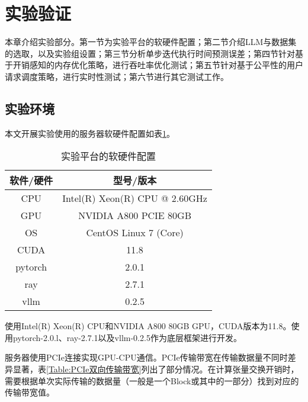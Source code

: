 \section{实验验证}

本章介绍实验部分。第一节为实验平台的软硬件配置；第二节介绍LLM与数据集的选取，以及实验组设置；第三节分析单步迭代执行时间预测误差；第四节针对基于开销感知的内存优化策略，进行吞吐率优化测试；第五节针对基于公平性的用户请求调度策略，进行实时性测试；第六节进行其它测试工作。

\subsection{实验环境}

本文开展实验使用的服务器软硬件配置如表\ref{Table:实验平台的软硬件配置}。

\begin{table}[H]
  \centering
  \caption{实验平台的软硬件配置}
  \label{Table:实验平台的软硬件配置}
  \renewcommand{\arraystretch}{1.2}
  \small
  \begin{tabular}{c c}
    \toprule
    \textbf{软件/硬件} & \textbf{型号/版本} \\ 
    \midrule
    CPU & Intel(R) Xeon(R) CPU @ 2.60GHz  \\ 
    GPU & NVIDIA A800 PCIE 80GB \\ 
    OS & CentOS Linux 7 (Core) \\ 
    CUDA & 11.8 \\ 
    pytorch & 2.0.1 \\ 
    ray & 2.7.1 \\
    vllm & 0.2.5 \\ 
    \bottomrule
  \end{tabular}
\end{table}

使用Intel(R) Xeon(R) CPU和NVIDIA A800 80GB GPU，CUDA版本为11.8。使用pytorch-2.0.l、ray-2.7.1以及vllm-0.2.5作为底层框架进行开发。 \par

服务器使用PCIe连接实现GPU-CPU通信。PCIe传输带宽在传输数据量不同时差异显著，表\ref{Table:PCIe双向传输带宽}列出了部分情况。在计算张量交换开销时，需要根据单次实际传输的数据量（一般是一个Block或其中的一部分）找到对应的传输带宽值。

